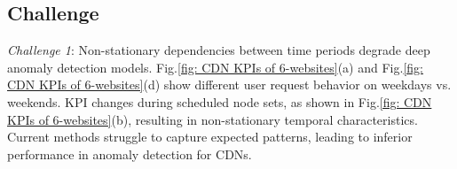 \documentclass[a0,portrait]{a0poster}
\begin{document}
\begin{multicols}{2}
\section*{Challenge}

\quad \textit{Challenge 1}: Non-stationary dependencies between time periods degrade deep anomaly detection models. Fig.\ref{fig: CDN KPIs of 6-websites}(a) and Fig.\ref{fig: CDN KPIs of 6-websites}(d) show different user request behavior on weekdays vs. weekends. KPI changes during scheduled node sets, as shown in Fig.\ref{fig: CDN KPIs of 6-websites}(b), resulting in non-stationary temporal characteristics. Current methods struggle to capture expected patterns, leading to inferior performance in anomaly detection for CDNs.

\begin{center}\vspace{1cm}
	

\end{center}
\end{multicols}
\end{document}
